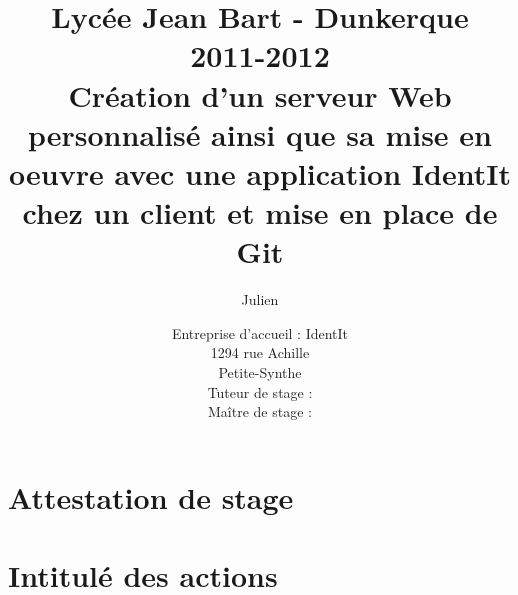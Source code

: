 \documentclass[12pt,a4paper]{report}
\title
{
	\normalsize{Lycée Jean Bart - Dunkerque\\
	2011-2012}\\
	\vspace{15mm}
  \LARGE{Création d'un serveur Web personnalisé ainsi que sa mise en
    oeuvre avec une application IdentIt chez un client et mise en
    place de Git
    \vspace{15mm}}
}
\author{\bsc{Stechele} Julien\\
	\vspace{35mm}
}
\date{
	\normalsize{Entreprise d'accueil : IdentIt\\
    1294 rue Achille \bsc{Pérès}\\
	Petite-Synthe\\
	\vspace{5mm}
  Tuteur de stage : \bsc{M.~Anselin}\\
	Maître de stage : \bsc{M.~Dubourg}
	}
}%
\begin{document}

\maketitle



\renewcommand{\contentsname}{Sommaire}

{\setlength{\baselineskip}{1.2\baselineskip}
\tableofcontents\par}











\appendix

\chapter{Attestation de stage} %
\label{cha:Attestation de stage}

\chapter{Intitulé des actions} %
\label{cha:Intitulé des actions}
\end{document}

